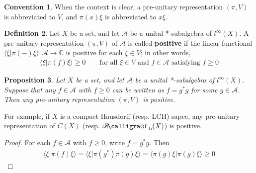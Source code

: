 \documentclass[12pt,b5paper,notitlepage]{article}
\theoremstyle{definition}
\newtheorem{df}{Definition}[subsection]
\newtheorem{cv}[df]{Convention}
\theoremstyle{plain}
\newtheorem{pp}[df]{Proposition}
\DeclareMathOperator{\Borb}{{\mathscr{B}\text{\kern -2pt {\calligra\large or}}\,}_{\mathrm b}}
\newcommand{\bk}[1]{\langle {#1}\rangle}
\newcommand{\scr}{\mathscr}
\newcommand{\Cbb}{\mathbb C}
\numberwithin{equation}{section}
\begin{document}
\begin{cv}
When the context is clear, a pre-unitary representation $(\pi,V)$ is abbreviated to $V$, and $\pi(x)\xi$ is abbreviated to $x\xi$.
\end{cv}


\begin{df}
Let $X$ be a set, and let $\scr A$ be a unital *-subalgebra of $l^\infty(X)$. A pre-unitary representation $(\pi,V)$ of $\scr A$ is called \textbf{positive}  if the linear functional $\bk{\xi|\pi(-)\xi}:\scr A\rightarrow\Cbb$ is positive for each $\xi\in V$; in other words,
\begin{align}
\bk{\xi|\pi(f)\xi}\geq0\qquad\text{for all }\xi\in V\text{ and }f\in\scr A\text{ satisfying }f\geq0
\end{align}
\end{df}

\begin{pp}\label{lb272}
Let $X$ be a set, and let $\scr A$ be a unital *-subalgebra of  $l^\infty(X)$. Suppose that any $f\in\scr A$ with $f\geq0$ can be written as $f=g^*g$ for some $g\in\scr A$. Then any pre-unitary representation $(\pi,V)$ is positive.
\end{pp}

For example, if $X$ is a compact Hausdorff (resp. LCH) sapce, any pre-unitary representation of $C(X)$ (resp. $\Borb(X)$) is positive.

\begin{proof}
For each $f\in\scr A$ with $f\geq0$, write $f=g^*g$. Then
\begin{align*}
\bk{\xi|\pi(f)\xi}=\bk{\xi|\pi(g^*)\pi(g)\xi}=\bk{\pi(g)\xi|\pi(g)\xi}\geq0
\end{align*}
\end{proof}
\end{document}
